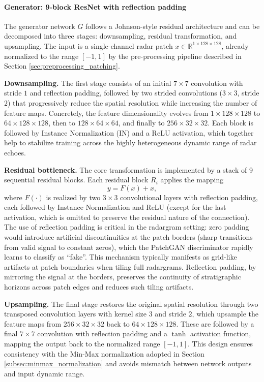 \paragraph{Generator: 9-block ResNet with reflection padding}
The generator network $G$ follows a Johnson-style residual architecture and can be decomposed into three stages: downsampling, residual transformation, and upsampling.
The input is a single-channel radar patch $x \in \mathbb{R}^{1 \times 128 \times 128}$, already normalized to the range $[-1, 1]$ by the pre-processing pipeline described in Section \ref{sec:preprocessing_patching}.

\textbf{Downsampling.} The first stage consists of an initial $7 \times 7$ convolution with stride $1$ and reflection padding, followed by two strided convolutions ($3 \times 3$, stride $2$) that progressively reduce the spatial resolution while increasing the number of feature maps.
Concretely, the feature dimensionality evolves from $1 \times 128 \times 128$ to $64 \times 128 \times 128$, then to $128 \times 64 \times 64$, and finally to $256 \times 32 \times 32$.
Each block is followed by Instance Normalization (IN) and a ReLU activation, which together help to stabilize training across the highly heterogeneous dynamic range of radar echoes.

\textbf{Residual bottleneck.} The core transformation is implemented by a stack of 9 sequential residual blocks.
Each residual block $R_i$ applies the mapping
\[
y = F(x) + x,
\]
where $F(\cdot)$ is realized by two $3 \times 3$ convolutional layers with reflection padding, each followed by Instance Normalization and ReLU (except for the last activation, which is omitted to preserve the residual nature of the connection).
The use of reflection padding is critical in the radargram setting: zero padding would introduce artificial discontinuities at the patch borders (sharp transitions from valid signal to constant zeros), which the PatchGAN discriminator rapidly learns to classify as \enquote{fake}.
This mechanism typically manifests as grid-like artifacts at patch boundaries when tiling full radargrams.
Reflection padding, by mirroring the signal at the borders, preserves the continuity of stratigraphic horizons across patch edges and reduces such tiling artifacts.

\textbf{Upsampling.} The final stage restores the original spatial resolution through two transposed convolution layers with kernel size $3$ and stride $2$, which upsample the feature maps from $256 \times 32 \times 32$ back to $64 \times 128 \times 128$.
These are followed by a final $7 \times 7$ convolution with reflection padding and a $\tanh$ activation function, mapping the output back to the normalized range $[-1, 1]$.
This design ensures consistency with the Min-Max normalization adopted in Section \ref{subsec:minmax_normalization} and avoids mismatch between network outputs and input dynamic range.


